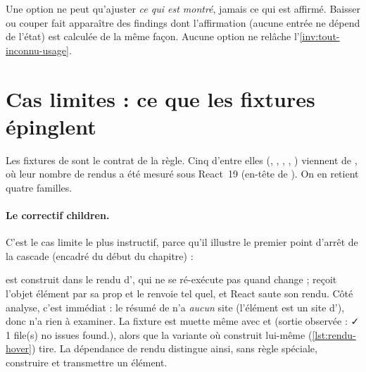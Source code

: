 \begin{piege}
Une option ne peut qu'ajuster \emph{ce qui est montré}, jamais ce qui est affirmé. Baisser
 ou couper  fait apparaître des findings dont
l'affirmation (\og aucune entrée ne dépend de l'état\fg{}) est calculée de la même façon. Aucune
option ne relâche l'\cref{inv:tout-inconnu-usage}.
\end{piege}

\section{Cas limites : ce que les fixtures épinglent}
\label{sec:regles-rendu-rsc-cas}

Les fixtures de  sont le contrat de la règle. Cinq
d'entre elles (, , , , )
viennent de , où leur nombre de rendus a été mesuré sous React~19
(en-tête de ). On en retient quatre familles.

\paragraph{Le correctif \og children\fg{}.} C'est le cas limite le plus instructif, parce qu'il
illustre le premier point d'arrêt de la cascade (encadré du début du chapitre) :


 est construit dans le rendu d', qui ne se ré-exécute pas quand
 change ;  reçoit l'objet élément par sa prop  et le
renvoie tel quel, et React saute son rendu. Côté analyse, c'est immédiat : le résumé de
 n'a \emph{aucun} site (l'élément est un site d'), donc
 n'a rien à examiner. La fixture est muette même avec
 et  (sortie observée : \og ✓ 1 file(s) no issues found.\fg{}), alors que
la variante où  construit lui-même 
(\cref{lst:rendu-hover}) tire. La dépendance de rendu distingue ainsi, sans règle spéciale,
\og construire\fg{} et \og transmettre\fg{} un élément.

